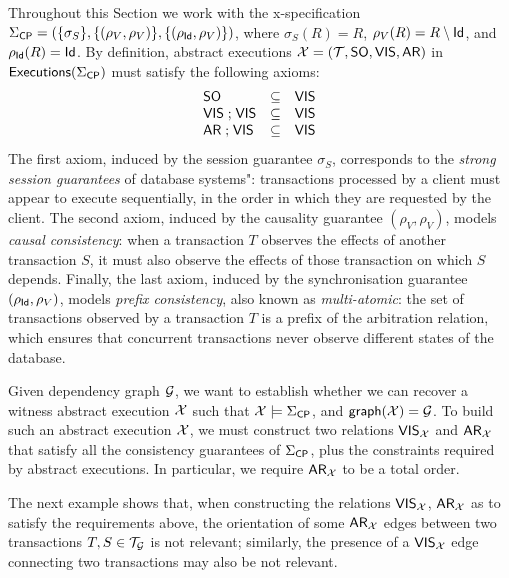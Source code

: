 \documentclass[a4paper,UKenglish]{article}%
\newif\ifdraft
\newcommand{\ac}[1]{\ifdraft{}{\color{blue}#1}\else{}\fi}
\theoremstyle{plain}
\begin{document}
Throughout this Section we work with the x-specification $\Sigma_{\mathsf{CP}} = (\{\sigma_{S}\}, \{(\rho_{V}, \rho_{V})\}, 
\{(\rho_{\mathsf{Id}}, \rho_V)\})$, where $\sigma_{S}(R) = R$, $\rho_V(R) = R \setminus \mathsf{Id}$, and $\rho_{\mathsf{Id}}(R) = \mathsf{Id}$. 
By definition, abstract executions $\mathcal{X} = (\mathcal{T}, {\sf{SO}}, {\mathsf{VIS}}, {\sf{AR}})$ in ${\mathsf{Executions}}(\Sigma_{\mathsf{CP}})$ must satisfy the following axioms:
\[
\begin{array}{lcl}
{\sf{SO}} &\subseteq& {\mathsf{VIS}}\\
{\mathsf{VIS}} \mathrel{;} {\mathsf{VIS}} &\subseteq& {\mathsf{VIS}}\\
{\sf{AR}} \mathrel{;} {\mathsf{VIS}} &\subseteq& {\mathsf{VIS}}
\end{array}
\]
\ac{The causal consistency axiom is not really needed here, as it is going to be implied by 
prefix consistency and the requirement of abstract executions that $\VIS \subseteq \AR$.}
The first axiom, induced by the session guarantee $\sigma_S$, corresponds to the \emph{strong 
session guarantees} of database systems": transactions processed by a client must appear to 
execute sequentially, in the order in which they are requested by the client.
The second axiom, induced by the causality guarantee $(\rho_V, \rho_V)$, models \emph{causal consistency}: 
when a transaction $T$ observes the effects of another transaction $S$, it must also observe the effects of 
those transaction on which $S$ depends.
Finally, the last axiom, induced by the synchronisation guarantee 
$(\rho_{\mathsf{Id}}, \rho_V)$, models \emph{prefix consistency}, also known as \emph{multi-atomic}: 
the set of transactions observed by a transaction $T$ is a prefix of the arbitration relation, 
which ensures that concurrent transactions never observe different states of the database. 

Given dependency graph $\mathcal{G}$, we want to establish whether we can recover a witness abstract 
execution $\mathcal{X}$ such that $\mathcal{X} \models \Sigma_{\mathsf{CP}}$, and $\mathsf{graph}(\mathcal{X}) = \mathcal{G}$. 
To build such an abstract execution $\mathcal{X}$, we must construct two relations ${\mathsf{VIS}}_{\mathcal{X}}$ and 
${\sf{AR}}_{\mathcal{X}}$ that satisfy all the consistency guarantees of $\Sigma_{\mathsf{CP}}$, plus the constraints 
required by abstract executions. In particular, we require ${\sf{AR}}_{\mathcal{X}}$ to be a total order.

The next example shows that, when constructing the relations ${\mathsf{VIS}}_{\mathcal{X}}$, ${\sf{AR}}_{\mathcal{X}}$ as 
to satisfy the requirements above, the orientation of some ${\sf{AR}}_{\mathcal{X}}$ edges between two 
transactions $T,S \in \mathcal{T}_{\mathcal{G}}$ is not relevant; similarly, the presence of a ${\mathsf{VIS}}_{\mathcal{X}}$ edge 
connecting two transactions may also be not relevant.
\end{document}
